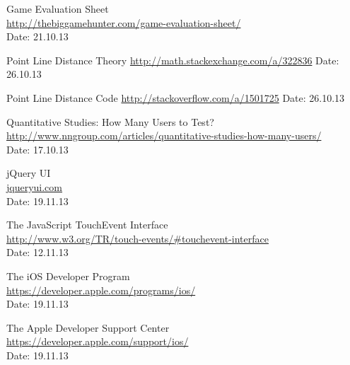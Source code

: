 \begin{thebibliography}{99}
	Game Evaluation Sheet \\
	\href {http://thebiggamehunter.com/game-evaluation-sheet/}{http://thebiggamehunter.com/game-evaluation-sheet/} \\
	Date: 21.10.13


	Point Line Distance Theory\newline
	\href {http://math.stackexchange.com/a/322836}{http://math.stackexchange.com/a/322836}\newline
	Date: 26.10.13

	Point Line Distance Code\newline
	\href {http://stackoverflow.com/a/1501725}{http://stackoverflow.com/a/1501725}\newline
	Date: 26.10.13

	Quantitative Studies: How Many Users to Test? \\
	\href {http://www.nngroup.com/articles/quantitative-studies-how-many-users/}{http://www.nngroup.com/articles/quantitative-studies-how-many-users/} \\
	Date: 17.10.13


	jQuery UI \\
	\href{http://jqueryui.com/}{jqueryui.com} \\
	Date: 19.11.13

  The JavaScript TouchEvent Interface \\
  \href {http://www.w3.org/TR/touch-events/\#touchevent-interface}{http://www.w3.org/TR/touch-events/\#touchevent-interface} \\
  Date: 12.11.13


  The iOS Developer Program \\
  \href {https://developer.apple.com/programs/ios/}{https://developer.apple.com/programs/ios/} \\
  Date: 19.11.13

  The Apple Developer Support Center \\
  \href {https://developer.apple.com/support/ios/}{https://developer.apple.com/support/ios/} \\
  Date: 19.11.13

\end{thebibliography}
\endgroup
